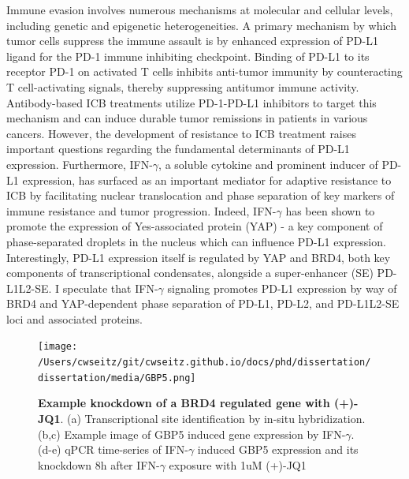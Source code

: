 Immune evasion involves numerous mechanisms at molecular and cellular levels, including genetic and epigenetic heterogeneities. A primary mechanism by which tumor cells suppress the immune assault is by enhanced expression of PD-L1 ligand for the PD-1 immune inhibiting checkpoint. Binding of PD-L1 to its receptor PD-1 on activated T cells inhibits anti-tumor immunity by counteracting T cell-activating signals, thereby suppressing antitumor immune activity. Antibody-based ICB treatments utilize PD-1-PD-L1 inhibitors to target this mechanism and can induce durable tumor remissions in patients in various cancers. However, the development of resistance to ICB treatment raises important questions regarding the fundamental determinants of PD-L1 expression. Furthermore, IFN-$\gamma$, a soluble cytokine and prominent inducer of PD-L1 expression, has surfaced as an important mediator for adaptive resistance to ICB by facilitating nuclear translocation and phase separation of key markers of immune resistance and tumor progression. Indeed, IFN-$\gamma$ has been shown to promote the expression of Yes-associated protein (YAP) - a key component of phase-separated droplets in the nucleus which can influence PD-L1 expression. Interestingly, PD-L1 expression itself is regulated by YAP and BRD4, both key components of transcriptional condensates, alongside a super-enhancer (SE) PD-L1L2-SE. I speculate that IFN-$\gamma$ signaling promotes PD-L1 expression by way of BRD4 and YAP-dependent phase separation of PD-L1, PD-L2, and PD-L1L2-SE loci and associated proteins.

\begin{figure}[t]
\texttt{[image: /Users/cwseitz/git/cwseitz.github.io/docs/phd/dissertation/dissertation/media/GBP5.png]}
\caption{\textbf{Example knockdown of a BRD4 regulated gene with (+)-JQ1}. (a) Transcriptional site identification by in-situ hybridization. (b,c) Example image of GBP5 induced gene expression by IFN-$\gamma$. (d-e) qPCR time-series of IFN-$\gamma$ induced GBP5 expression and its knockdown 8h after IFN-$\gamma$ exposure with 1uM (+)-JQ1}
\label{fig:fig31}
\end{figure}

